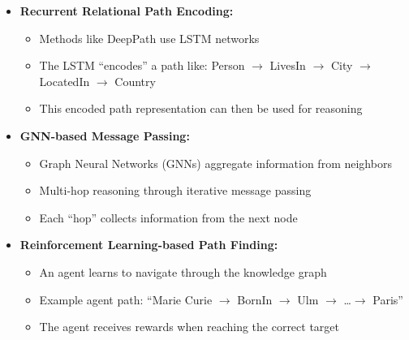 \begin{itemize}
    \item \textbf{Recurrent Relational Path Encoding:}
    \begin{itemize}
        \item Methods like DeepPath use LSTM networks
        \item The LSTM ``encodes'' a path like: Person $\rightarrow$ LivesIn $\rightarrow$ City $\rightarrow$ LocatedIn $\rightarrow$ Country
        \item This encoded path representation can then be used for reasoning
    \end{itemize}

    \item \textbf{GNN-based Message Passing:}
    \begin{itemize}
        \item Graph Neural Networks (GNNs) aggregate information from neighbors
        \item Multi-hop reasoning through iterative message passing
        \item Each ``hop'' collects information from the next node
    \end{itemize}

    \item \textbf{Reinforcement Learning-based Path Finding:}
    \begin{itemize}
        \item An agent learns to navigate through the knowledge graph
        \item Example agent path: ``Marie Curie $\rightarrow$ BornIn $\rightarrow$ Ulm $\rightarrow$ \dots $\rightarrow$ Paris''
        \item The agent receives rewards when reaching the correct target
    \end{itemize}
\end{itemize}


